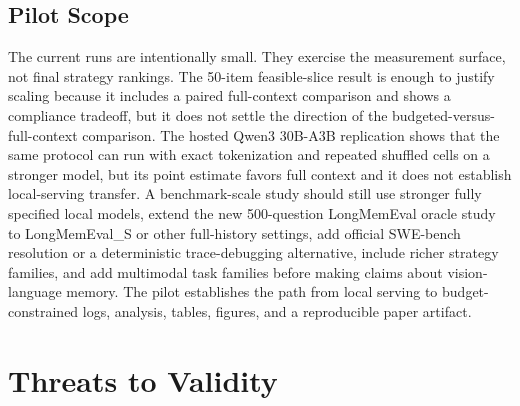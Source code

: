 \documentclass[11pt]{article}
\begin{document}
\subsection{Pilot Scope}

The current runs are intentionally small.  They exercise the measurement
surface, not final strategy rankings.  The 50-item
feasible-slice result is enough to justify scaling because it includes a
paired full-context comparison and shows a compliance tradeoff, but it does
not settle the direction of the budgeted-versus-full-context comparison.  The
hosted Qwen3 30B-A3B replication shows that the same protocol can run with
exact tokenization and repeated shuffled cells on a stronger model, but its
point estimate favors full context and it does not establish local-serving
transfer.
A benchmark-scale study should still use stronger fully specified local models,
extend the new 500-question LongMemEval oracle study to LongMemEval\_S or other
full-history settings, add official SWE-bench resolution or a deterministic trace-debugging
alternative, include richer strategy families, and add multimodal task
families before making claims about vision-language memory.  The pilot
establishes the path from local serving to budget-constrained logs, analysis,
tables, figures, and a reproducible paper artifact.

\section{Threats to Validity}
\end{document}
